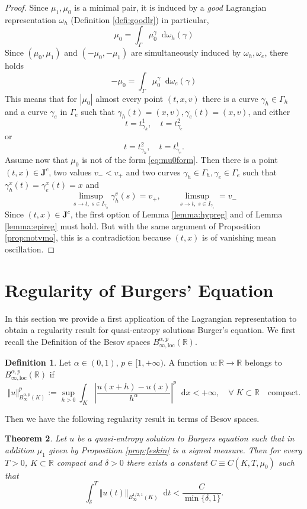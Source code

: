 \documentclass[11pt, twoside, reqno]{amsart}
\newtheorem{thm}{Theorem}[section]
\theoremstyle{definition}
\newtheorem{defi}[thm]{Definition}
\theoremstyle{remark}
\numberwithin{equation}{section}
\newcommand*\dif{\mathop{}\!\mathrm{d}}
\newcommand{\mr}[1]{\mathrm{#1}}
\begin{document}
\begin{proof}
    Since $\mu_1, \mu_0$ is a minimal pair, it is induced by a \emph{good} Lagrangian representation $\omega_h$ (Definition \ref{defi:goodlr}) in particular,
    $$
    \mu_0 =  \int_{\Gamma} \mu_0^\gamma \dif \omega_h(\gamma)
    $$
    Since $(\mu_0, \mu_1)$ and $(-\mu_0, -\mu_1)$ are simultaneously induced by $\omega_h, \omega_e$, there holds
    $$
    -\mu_0 = \int_{\Gamma} \mu_0^\gamma \dif \omega_e(\gamma)
    $$
    This means that for $|\mu_0|$ almost every point $(t,x,v)$ there is a curve $\gamma_h \in \Gamma_h$ and a curve $\gamma_e$ in $\Gamma_e$ such that $\gamma_h(t) = (x, v), \gamma_e(t) = (x,v)$, and either 
    $$
    t = t^1_{\gamma_h}, \quad t = t^2_{\gamma_e}
    $$
    or 
    $$
    t = t^2_{\gamma_h}, \quad t = t^1_{\gamma_e}.
    $$
Assume now that $\mu_0$ is not of the form \eqref{eq:mu0form}. Then there is a point $(t,x) \in \mathbf J^c$, two values $v_- < v_+$ and two curves $\gamma_h \in \Gamma_h, \gamma_e \in \Gamma_e$ such that $\gamma_h^x(t) =\gamma_e^x(t) = x$ and
$$
\limsup_{s \to t, \; s \in I_{\gamma_h}} \gamma^v_h(s) = v_+, \qquad \limsup_{s \to t, \; s \in I_{\gamma_e}} = v_-
$$
Since $(t,x) \in \mathbf J^c$, the first option of Lemma \ref{lemma:hypreg} and of Lemma \ref{lemma:epireg} must hold. But with the same argument of Proposition \ref{prop:notvmo}, this is a contradiction because $(t,x)$ is of vanishing mean oscillation.    
\end{proof}



\section{Regularity of Burgers' Equation}\label{sec:RBE}
In this section we provide a first application of the Lagrangian representation to obtain a regularity result for quasi-entropy solutions Burger's equation.
We first recall the Definition of the Besov spaces $B^{\alpha, p}_{\infty, \mr{loc}}(\mathbb R)$.
\begin{defi}
   Let $\alpha \in (0, 1)$, $p \in [1, +\infty)$. A function $u: \mathbb R \to \mathbb R$ belongs to $B^{\alpha, p}_{\infty, \mr{loc}}(\mathbb R)$ if 
    \begin{equation}
       \Vert u\Vert^p_{B^{\alpha, p}_{\infty}(K)}:= \sup_{h > 0} \int_{K} \left| \frac{u(x+h)-u(x)}{h^{\alpha}}\right|^p \dif x  < +\infty, \quad \forall \; K \subset \mathbb R\quad \text{compact}.
    \end{equation}
\end{defi}
Then we have the following regularity result in terms of Besov spaces.
\begin{thm}\label{thm:besov}
     Let $u$ be a quasi-entropy solution to Burgers equation such that in addition $\mu_1$ given by Proposition \ref{prop:feskin} is a signed measure.
Then for every $T> 0$, $K \subset \mathbb R$ compact and $\delta > 0$ there exists a constant $C \equiv C(K, T, \mu_0)$ such that 
\begin{equation}
\int_{\delta}^T \Vert u(t)\Vert_{B^{1/2, 1}_{\infty}(K)} \dif t < \frac{C}{\min\{\delta,1\}}.
\end{equation}
 \end{thm}
\end{document}
